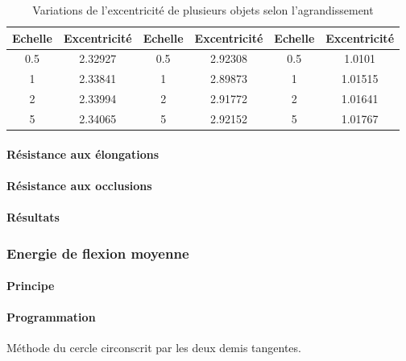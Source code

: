 \documentclass{article}
\begin{document}
\begin{table}
\begin{tabular}{|c|c|c|c|c|c|}
	    \hline
	    \textbf{Echelle} & \textbf{Excentricité} & \textbf{Echelle} & \textbf{Excentricité} & \textbf{Echelle} & \textbf{Excentricité} \\
	    \hline
	    0.5 & 2.32927 & 0.5 & 2.92308 & 0.5 & 1.0101 \\
	    \hline
	    1 & 2.33841 & 1 & 2.89873 & 1 & 1.01515 \\
	    \hline
	    2 & 2.33994 & 2 & 2.91772 & 2 & 1.01641 \\
	    \hline
	    5 & 2.34065 & 5 & 2.92152 & 5 & 1.01767 \\
	    \hline
	  \end{tabular}
	  \caption{Variations de l'excentricité de plusieurs objets selon l'agrandissement}
	  \label{excentricité-scaling-table}
	  \end{table}  
	  
	\paragraph{Résistance aux élongations}
	
	\paragraph{Résistance aux occlusions}
	  
	\paragraph{Résultats}
	  

      
      \subsubsection{Energie de flexion moyenne}
      
	\paragraph{Principe}
	
	\paragraph{Programmation}
	
	  Méthode du cercle circonscrit par les deux demis tangentes.
	  
\end{document}
